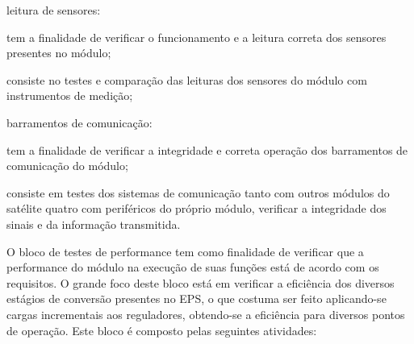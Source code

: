 \begin{alineas}
    \item leitura de sensores:
    \begin{alineas}
        \item tem a finalidade de verificar o funcionamento e a leitura correta dos sensores presentes no módulo;
        \item consiste no testes e comparação das leituras dos sensores do módulo com instrumentos de medição;
    \end{alineas}

    \item barramentos de comunicação:
    \begin{alineas}
        \item tem a finalidade de verificar a integridade e correta operação dos barramentos de comunicação do módulo;
        \item consiste em testes dos sistemas de comunicação tanto com outros módulos do satélite quatro com periféricos do próprio módulo, verificar a integridade dos sinais e da informação transmitida.
    \end{alineas}
\end{alineas}

O bloco de testes de performance tem como finalidade de verificar que a performance do módulo na execução de suas funções está de acordo com os requisitos.
O grande foco deste bloco está em verificar a eficiência dos diversos estágios de conversão presentes no \gls{EPS}, o que costuma ser feito aplicando-se cargas incrementais aos reguladores, obtendo-se a eficiência para diversos pontos de operação.
Este bloco é composto pelas seguintes atividades:

